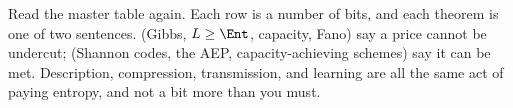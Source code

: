 \begin{strand}
Read the master table again. Each row is a number of bits, and each theorem is one of two
sentences.  (Gibbs, $L\ge\Ent$, capacity, Fano) say a price cannot be undercut;
 (Shannon codes, the AEP, capacity-achieving schemes) say it can be met.
Description, compression, transmission, and learning are all the same act of paying entropy, and
not a bit more than you must.
\end{strand}

